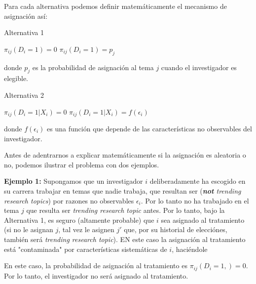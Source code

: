 \documentclass[12pt, letter]{article}
\begin{document}
Para cada alternativa podemos definir matemáticamente el mecanismo de asignación así:

\begin{algorithm}
\caption{Alternativa 1}
\begin{algorithmic}
            \STATE $\pi_{ij}(D_i = 1) = 0$
        \ELSE
            \STATE $\pi_{ij}(D_i = 1) = p_j$
        \ENDIF
    \ENDFOR
\ENDFOR
\end{algorithmic}
\end{algorithm}

donde $p_j$ es la probabilidad de asignación al tema $j$ cuando el investigador es elegible.

\begin{algorithm}
\caption{Alternativa 2}
\begin{algorithmic}
            \STATE $\pi_{ij}(D_i = 1 | X_i) = 0$
        \ELSE
            \STATE $\pi_{ij}(D_i = 1 | X_i) = f(\epsilon_i)$
        \ENDIF
    \ENDFOR
\ENDFOR
\end{algorithmic}
\end{algorithm}

donde $f(\epsilon_i)$ es una función que depende de las características no observables del investigador.

Antes de adentrarnos a explicar matemáticamente si la asignación es aleatoria o no, podemos ilustrar el problema con dos ejemplos.

\textbf{Ejemplo 1:} Supongamos que un investigador $i$ deliberadamente ha escogido en su carrera trabajar en temas que nadie trabaja, que resultan ser (\textit{\textbf{not} trending research topics}) por razones no observables $\epsilon_i$. Por lo tanto no ha trabajado en el tema $j$ que resulta ser \textit{trending research topic} antes. Por lo tanto, bajo la Alternativa 1, es seguro (altamente probable) que $i$ sea asignado al tratamiento (si no le asignan $j$, tal vez le asignen $j'$ que, por su historial de elecciónes, también será \textit{trending research topic}). EN este caso la asignación al tratamiento está "contaminada" por características sistemáticas de $i$, haciéndole 

En este caso, la probabilidad de asignación al tratamiento es $\pi_{ij}(D_i = 1, ) = 0$. Por lo tanto, el investigador no será asignado al tratamiento.
\end{document}
